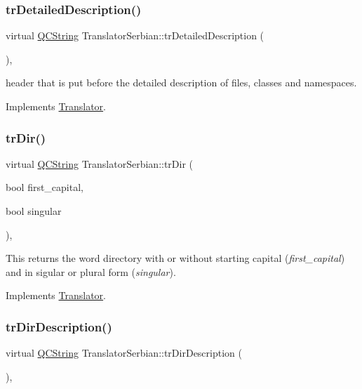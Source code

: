 \subsubsection{\texorpdfstring{trDetailedDescription()}{trDetailedDescription()}}
{\footnotesize\ttfamily virtual \mbox{\hyperlink{class_q_c_string}{Q\+C\+String}} Translator\+Serbian\+::tr\+Detailed\+Description (\begin{DoxyParamCaption}{ }\end{DoxyParamCaption})\hspace{0.3cm}{\ttfamily [inline]}, {\ttfamily [virtual]}}

header that is put before the detailed description of files, classes and namespaces. 

Implements \mbox{\hyperlink{class_translator}{Translator}}.

\mbox{\label{class_translator_serbian_a0ef3c79ea68cd8db2ea7eec67d7cae73}} 
\subsubsection{\texorpdfstring{trDir()}{trDir()}}
{\footnotesize\ttfamily virtual \mbox{\hyperlink{class_q_c_string}{Q\+C\+String}} Translator\+Serbian\+::tr\+Dir (\begin{DoxyParamCaption}\item[{bool}]{first\+\_\+capital,  }\item[{bool}]{singular }\end{DoxyParamCaption})\hspace{0.3cm}{\ttfamily [inline]}, {\ttfamily [virtual]}}

This returns the word directory with or without starting capital ({\itshape first\+\_\+capital}) and in sigular or plural form ({\itshape singular}). 

Implements \mbox{\hyperlink{class_translator}{Translator}}.

\mbox{\label{class_translator_serbian_a5e48d7d4d826b82e629b1fd4ab63bf83}} 
\subsubsection{\texorpdfstring{trDirDescription()}{trDirDescription()}}
{\footnotesize\ttfamily virtual \mbox{\hyperlink{class_q_c_string}{Q\+C\+String}} Translator\+Serbian\+::tr\+Dir\+Description (\begin{DoxyParamCaption}{ }\end{DoxyParamCaption})\hspace{0.3cm}{\ttfamily [inline]}, {\ttfamily [virtual]}}

